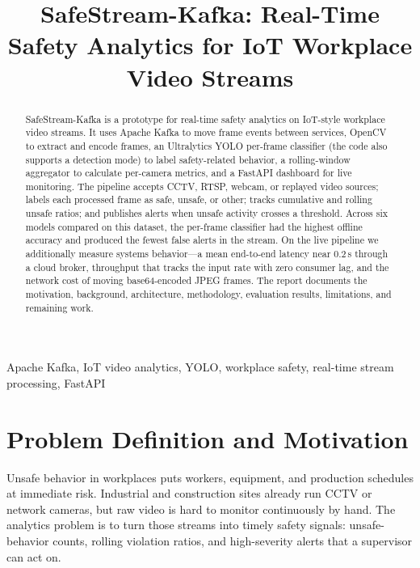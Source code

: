 \documentclass[conference]{IEEEtran}
\begin{document}
\title{SafeStream-Kafka: Real-Time Safety Analytics for IoT Workplace Video Streams\\
}

\author{
}

\maketitle
\begin{abstract}
SafeStream-Kafka is a prototype for real-time safety analytics on IoT-style workplace video streams. It uses Apache Kafka to move frame events between services, OpenCV to extract and encode frames, an Ultralytics YOLO per-frame classifier (the code also supports a detection mode) to label safety-related behavior, a rolling-window aggregator to calculate per-camera metrics, and a FastAPI dashboard for live monitoring. The pipeline accepts CCTV, RTSP, webcam, or replayed video sources; labels each processed frame as safe, unsafe, or other; tracks cumulative and rolling unsafe ratios; and publishes alerts when unsafe activity crosses a threshold. Across six models compared on this dataset, the per-frame classifier had the highest offline accuracy and produced the fewest false alerts in the stream. On the live pipeline we additionally measure systems behavior---a mean end-to-end latency near 0.2\,s through a cloud broker, throughput that tracks the input rate with zero consumer lag, and the network cost of moving base64-encoded JPEG frames. The report documents the motivation, background, architecture, methodology, evaluation results, limitations, and remaining work.
\end{abstract}

\begin{IEEEkeywords}
Apache Kafka, IoT video analytics, YOLO, workplace safety,
real-time stream processing, FastAPI
\end{IEEEkeywords}


\section{Problem Definition and Motivation}
Unsafe behavior in workplaces puts workers, equipment, and production schedules at immediate risk. Industrial and construction sites already run CCTV or network cameras, but raw video is hard to monitor continuously by hand. The analytics problem is to turn those streams into timely safety signals: unsafe-behavior counts, rolling violation ratios, and high-severity alerts that a supervisor can act on.
\end{document}
